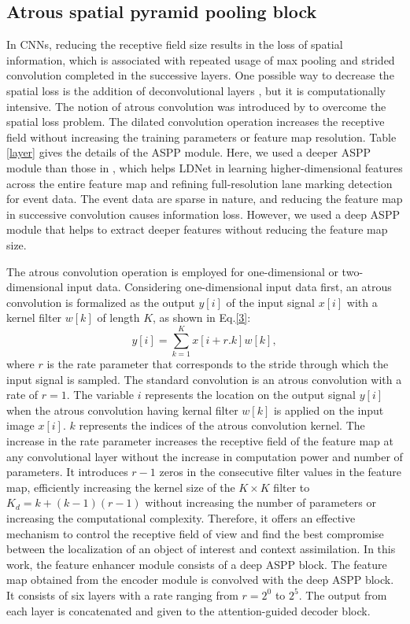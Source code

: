 \documentclass[journal]{IEEEtran}
\begin{document}
\subsection{Atrous spatial pyramid pooling block}
In CNNs, reducing the receptive field size results in the loss of spatial information, which is associated with repeated usage of max pooling and strided convolution completed in the successive layers. One possible way to decrease the spatial loss is the addition of deconvolutional layers \cite{Long2015} \cite{a2}, but it is computationally intensive. The notion of atrous convolution was introduced by \cite{a3} \cite{a4} to overcome the spatial loss problem. The dilated convolution operation increases the receptive field without increasing the training parameters or feature map resolution. 
Table \ref{layer} gives the details of the ASPP module. Here, we used a deeper ASPP module than those in \cite{a3} \cite{a4}, which helps LDNet in learning higher-dimensional features across the entire feature map and refining full-resolution lane marking detection for event data. The event data are sparse in nature, and reducing the feature map in successive convolution causes information loss. However, we used a deep ASPP module that helps to extract deeper features without reducing the feature map size.
\par
The atrous convolution operation is employed for one-dimensional or two-dimensional input data. Considering one-dimensional input data first, an atrous convolution is formalized as the output $y[i]$ of the input signal $x[i]$ with a kernel filter $w[k]$ of length $K$, as shown in Eq.\ref{3}:
\begin{equation}
y[i]=\sum_{k=1}^{K} x[i+r.k]w[k],
\label{3}
\end{equation}
where $r$ is the rate parameter that corresponds to the stride through which the input signal is sampled. The standard convolution is an atrous convolution with a rate of $r=1$. The variable $i$ represents the location on the output signal $y[i]$ when the atrous convolution having kernal filter $w[k]$ is applied on the input image $x[i]$. $k$ represents the indices of the atrous convolution kernel. The increase in the rate parameter increases the receptive field of the feature map at any convolutional layer without the increase in computation power and number of parameters. It introduces $r-1$ zeros in the consecutive filter values in the feature map, efficiently increasing the kernel size of the $K \times K$ filter to $K_d=k+(k-1)(r-1)$ without increasing the number of parameters or increasing the computational complexity. Therefore, it offers an effective mechanism to control the receptive field of view and find the best compromise between the localization of an object of interest and context assimilation. In this work, the feature enhancer module consists of a deep ASPP block. The feature map obtained from the encoder module is convolved with the deep ASPP block. It consists of six layers with a rate ranging from $r=2^0$ to $2^5$. The output from each layer is concatenated and given to the attention-guided decoder block.
\end{document}
